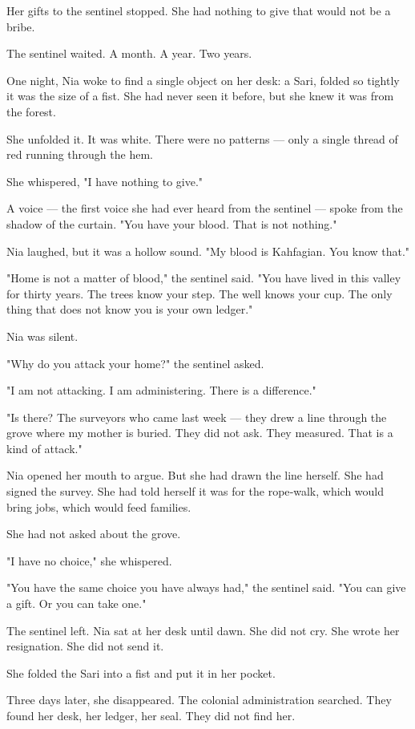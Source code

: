 \documentclass[10pt,twoside]{book}
\begin{document}
Her gifts to the sentinel stopped. She had nothing to give that would not be a bribe.

The sentinel waited. A month. A year. Two years.

One night, Nia woke to find a single object on her desk: a Sari, folded so tightly it was the size of a fist. She had never seen it before, but she knew it was from the forest.

She unfolded it. It was white. There were no patterns --- only a single thread of red running through the hem.

She whispered, "I have nothing to give."

A voice --- the first voice she had ever heard from the sentinel --- spoke from the shadow of the curtain. "You have your blood. That is not nothing."

Nia laughed, but it was a hollow sound. "My blood is Kahfagian. You know that."

"Home is not a matter of blood," the sentinel said. "You have lived in this valley for thirty years. The trees know your step. The well knows your cup. The only thing that does not know you is your own ledger."

Nia was silent.

"Why do you attack your home?" the sentinel asked.

"I am not attacking. I am administering. There is a difference."

"Is there? The surveyors who came last week --- they drew a line through the grove where my mother is buried. They did not ask. They measured. That is a kind of attack."

Nia opened her mouth to argue. But she had drawn the line herself. She had signed the survey. She had told herself it was for the rope‑walk, which would bring jobs, which would feed families.

She had not asked about the grove.

"I have no choice," she whispered.

"You have the same choice you have always had," the sentinel said. "You can give a gift. Or you can take one."

The sentinel left. Nia sat at her desk until dawn. She did not cry. She wrote her resignation. She did not send it.

She folded the Sari into a fist and put it in her pocket.

Three days later, she disappeared. The colonial administration searched. They found her desk, her ledger, her seal. They did not find her.
\end{document}
